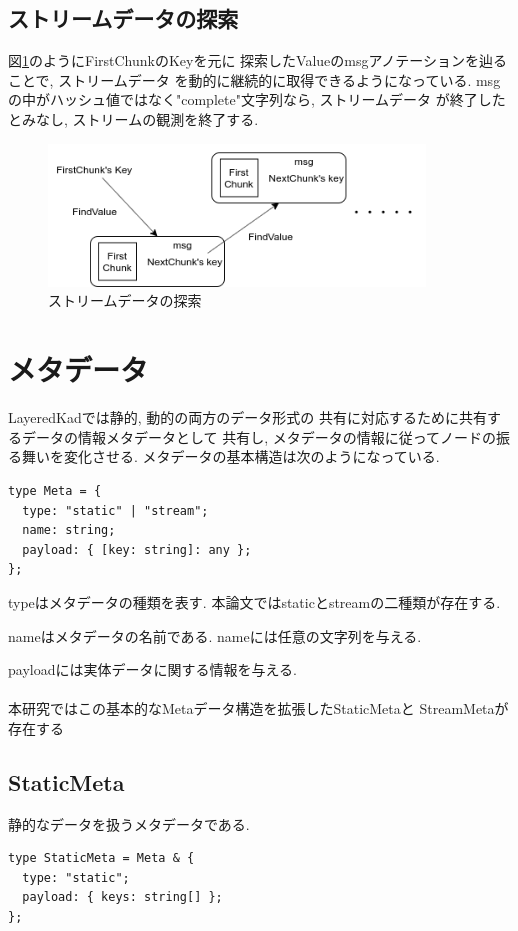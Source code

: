 \documentclass[sotsuron]{jcsie}
\begin{document}
\subsection{ストリームデータの探索}
\label{sec:subscribe-stream}
図\ref{fig:subscribe-stream}のようにFirstChunkのKeyを元に
探索したValueのmsgアノテーションを辿ることで, ストリームデータ
を動的に継続的に取得できるようになっている.
msgの中がハッシュ値ではなく"complete"文字列なら, ストリームデータ
が終了したとみなし, ストリームの観測を終了する.

\begin{figure}[H]
	\centering
	\includegraphics[width=10cm]{./assets/image/subscribeStream.png}
	\caption{ストリームデータの探索}
	\label{fig:subscribe-stream}
\end{figure}

\section{メタデータ}
LayeredKadでは静的, 動的の両方のデータ形式の
共有に対応するために共有するデータの情報メタデータとして
共有し, メタデータの情報に従ってノードの振る舞いを変化させる.
メタデータの基本構造は次のようになっている.
\\
\begin{lstlisting}
type Meta = {
  type: "static" | "stream";
  name: string;
  payload: { [key: string]: any };
};
\end{lstlisting}

typeはメタデータの種類を表す.
本論文ではstaticとstreamの二種類が存在する.

nameはメタデータの名前である. nameには任意の文字列を与える.

payloadには実体データに関する情報を与える.
\\\\
本研究ではこの基本的なMetaデータ構造を拡張したStaticMetaと
StreamMetaが存在する

\subsection{StaticMeta}
静的なデータを扱うメタデータである.
\\
\begin{lstlisting}
type StaticMeta = Meta & {
  type: "static";
  payload: { keys: string[] };
};
\end{lstlisting}
\end{document}

